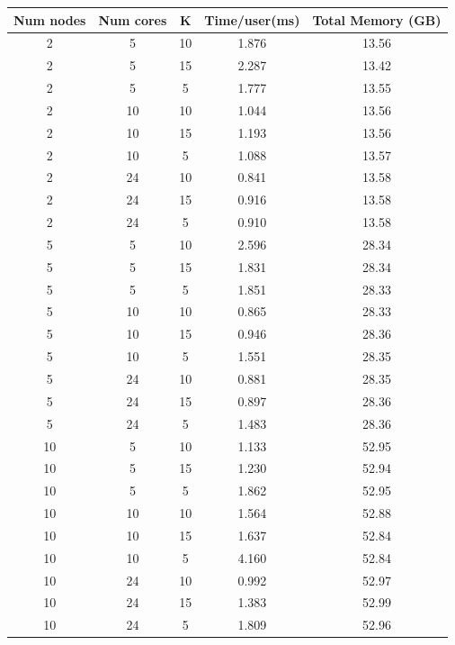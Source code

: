 \documentclass[hidelinks,12pt]{article}
\begin{document}
\begin{table}
  \centering
  \begin{tabular}{|c|c|c|c|c|}
    \hline

    Num nodes & Num cores & K  & Time/user(ms) & Total Memory (GB) \\ \hline
    2         & 5         & 10 & 1.876         & 13.56             \\
    2         & 5         & 15 & 2.287         & 13.42             \\
    2         & 5         & 5  & 1.777         & 13.55             \\
    2         & 10        & 10 & 1.044         & 13.56             \\
    2         & 10        & 15 & 1.193         & 13.56             \\
    2         & 10        & 5  & 1.088         & 13.57             \\
    2         & 24        & 10 & 0.841         & 13.58             \\
    2         & 24        & 15 & 0.916         & 13.58             \\
    2         & 24        & 5  & 0.910         & 13.58             \\
    5         & 5         & 10 & 2.596         & 28.34             \\
    5         & 5         & 15 & 1.831         & 28.34             \\
    5         & 5         & 5  & 1.851         & 28.33             \\
    5         & 10        & 10 & 0.865         & 28.33             \\
    5         & 10        & 15 & 0.946         & 28.36             \\
    5         & 10        & 5  & 1.551         & 28.35             \\
    5         & 24        & 10 & 0.881         & 28.35             \\
    5         & 24        & 15 & 0.897         & 28.36             \\
    5         & 24        & 5  & 1.483         & 28.36             \\
    10        & 5         & 10 & 1.133         & 52.95             \\
    10        & 5         & 15 & 1.230         & 52.94             \\
    10        & 5         & 5  & 1.862         & 52.95             \\
    10        & 10        & 10 & 1.564         & 52.88             \\
    10        & 10        & 15 & 1.637         & 52.84             \\
    10        & 10        & 5  & 4.160         & 52.84             \\
    10        & 24        & 10 & 0.992         & 52.97             \\
    10        & 24        & 15 & 1.383         & 52.99             \\
    10        & 24        & 5  & 1.809         & 52.96             \\


\end{tabular}
\end{table}
\end{document}
